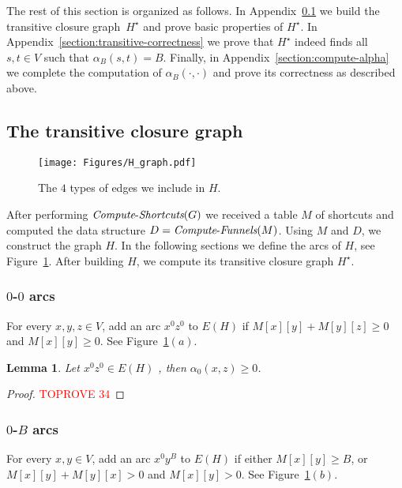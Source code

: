 \documentclass[11pt]{article}
\newtheorem{lemma}[theorem]{Lemma}
\newcommand{\ComputeF}{\mbox{{\it Compute}-{\it Funnels}}}
\newcommand{\ComputeS}{\mbox{{\it Compute}-{\it Shortcuts}}}
\begin{document}
The rest of this section is organized as follows. In Appendix~\ref{section:transitive-graph} we build the transitive closure graph~$H^\star$ and prove basic properties of $H^\star$. In Appendix~\ref{section:transitive-correctness} we prove that $H^\star$ indeed finds all $s,t\in V$ such that $\alpha_B(s,t)=B$. Finally, in Appendix~\ref{section:compute-alpha} we complete the computation of $\alpha_B(\cdot,\cdot)$ and prove its correctness as described above. 

\subsection{The transitive closure graph}\label{section:transitive-graph}

\begin{figure}
    \centering
\texttt{[image: Figures/H\_graph.pdf]}
\caption{The $4$ types of edges we include in $H$.}
\label{fig:H}
\end{figure}

After performing $\ComputeS(G)$ we received a table $M$ of shortcuts and computed the data structure $D=\ComputeF(M)$. Using $M$ and $D$, we construct the graph $H$. 
In the following sections we define the arcs of $H$, see Figure~\ref{fig:H}. After building $H$, we compute its transitive closure graph $H^\star$.

\subsubsection{\texorpdfstring{$0$-$0$}{0-0} arcs}
For every $x,y,z \in V$, add an arc $x^0 z^0$ to $E(H)$ if $M[x][y]+M[y][z]\ge 0$ and $M[x][y]\ge 0$. See Figure~\ref{fig:H}$(a)$.

\begin{lemma}\label{lemma:0-0}
    Let $x^0 z^0 \in E(H)$ , then $\alpha_0(x,z) \ge 0$. 
\end{lemma}

\begin{proof}\textcolor{red}{TOPROVE 34}\end{proof}


\subsubsection{\texorpdfstring{$0$-$B$}{0-B} arcs}
For every $x,y\in V$, add an arc $x^0 y^B$ to $E(H)$ if either $M[x][y]\ge B$, or $M[x][y]+M[y][x]>0$ and $M[x][y]>0$. See Figure~\ref{fig:H}$(b)$.
\end{document}
